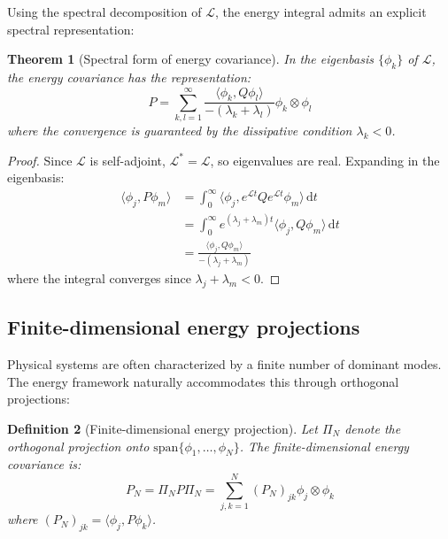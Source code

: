 \documentclass[a4paper,12pt]{article}
\newtheorem{theorem}{Theorem}[section]
\newtheorem{definition}[theorem]{Definition}
\newcommand{\dd}{\,\mathrm{d}}
\newcommand{\inner}[2]{\langle #1, #2 \rangle}
\begin{document}
Using the spectral decomposition of $\mathcal{L}$, the energy integral admits an explicit spectral representation:

\begin{theorem}[Spectral form of energy covariance]\label{thm:spectral_covariance}
In the eigenbasis $\{\phi_k\}$ of $\mathcal{L}$, the energy covariance has the representation:
\begin{equation}\label{eq:spectral_representation}
P = \sum_{k,l=1}^{\infty} \frac{\inner{\phi_k}{Q\phi_l}}{-(\lambda_k + \lambda_l)} \phi_k \otimes \phi_l
\end{equation}
where the convergence is guaranteed by the dissipative condition $\lambda_k < 0$.
\end{theorem}

\begin{proof}
Since $\mathcal{L}$ is self-adjoint, $\mathcal{L}^* = \mathcal{L}$, so eigenvalues are real. Expanding in the eigenbasis:
\begin{align}
\inner{\phi_j}{P\phi_m} &= \int_0^{\infty} \inner{\phi_j}{e^{\mathcal{L}t} Q e^{\mathcal{L}t} \phi_m} \dd t\\
&= \int_0^{\infty} e^{(\lambda_j + \lambda_m)t} \inner{\phi_j}{Q\phi_m} \dd t\\
&= \frac{\inner{\phi_j}{Q\phi_m}}{-(\lambda_j + \lambda_m)}
\end{align}
where the integral converges since $\lambda_j + \lambda_m < 0$.
\end{proof}

\subsection{Finite-dimensional energy projections}

Physical systems are often characterized by a finite number of dominant modes. The energy framework naturally accommodates this through orthogonal projections:

\begin{definition}[Finite-dimensional energy projection]\label{def:finite_projection}
Let $\Pi_N$ denote the orthogonal projection onto $\text{span}\{\phi_1, \ldots, \phi_N\}$. The finite-dimensional energy covariance is:
\begin{equation}
P_N = \Pi_N P \Pi_N = \sum_{j,k=1}^N (P_N)_{jk} \phi_j \otimes \phi_k
\end{equation}
where $(P_N)_{jk} = \inner{\phi_j}{P\phi_k}$.
\end{definition}
\end{document}

